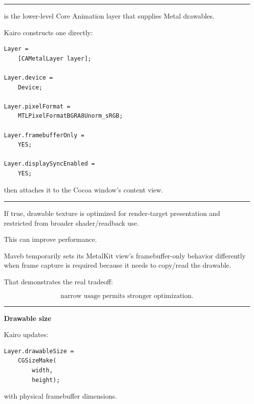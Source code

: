 \begin{center}\rule{0.5\linewidth}{0.5pt}\end{center}

\textbf{}

 is the lower-level Core Animation layer that supplies Metal drawables.

Kairo constructs one directly:

\begin{verbatim}
Layer =
    [CAMetalLayer layer];

Layer.device =
    Device;

Layer.pixelFormat =
    MTLPixelFormatBGRA8Unorm_sRGB;

Layer.framebufferOnly =
    YES;

Layer.displaySyncEnabled =
    YES;
\end{verbatim}

then attaches it to the Cocoa window's content view.

\begin{center}\rule{0.5\linewidth}{0.5pt}\end{center}

\textbf{}

If true, drawable texture is optimized for render-target presentation and restricted from broader shader/readback use.

This can improve performance.

Maveb temporarily sets its MetalKit view's framebuffer-only behavior differently when frame capture is required because it needs to copy/read the drawable.

That demonstrates the real tradeoff:

\[
\boxed{
\text{narrow usage permits stronger optimization}.
}
\]

\begin{center}\rule{0.5\linewidth}{0.5pt}\end{center}

\textbf{Drawable size}

Kairo updates:

\begin{verbatim}
Layer.drawableSize =
    CGSizeMake(
        width,
        height);
\end{verbatim}

with physical framebuffer dimensions.

